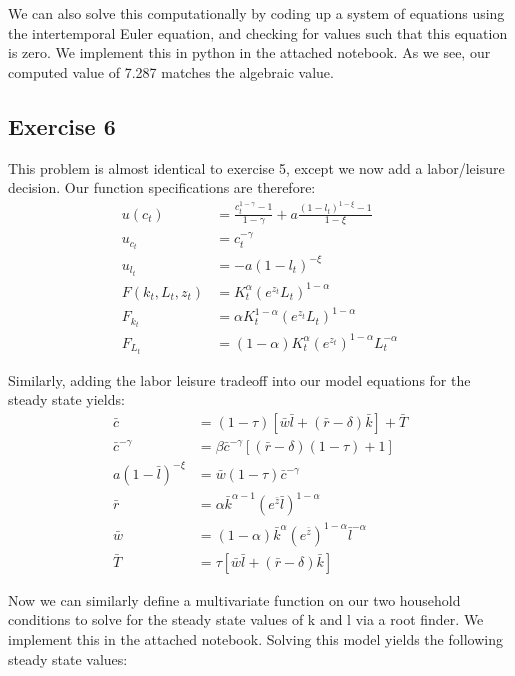 \documentclass{article}
\begin{document}
	We can also solve this computationally by coding up a system of equations using the intertemporal Euler equation, and checking for values such that this equation is zero. We implement this in python in the attached notebook. As we see, our computed value of 7.287 matches the algebraic value. 
	
	\subsection*{Exercise 6}
	This problem is almost identical to exercise 5, except we now add a labor/leisure decision. Our function specifications are therefore:
	\begin{align*}
	u(c_t) &= \frac{c_t^{1 - \gamma} - 1}{1 - \gamma}  + a\frac{(1-l_t)^{1-\xi} -1}{1 -\xi} \\
	u_{c_t} &= c_t^{-\gamma} \\
	u_{l_t} &= - a (1 -l_t)^{-\xi} \\
	F(k_t, L_t, z_t) &= K_t^{\alpha} (e^{z_t}L_t)^{1-\alpha} \\
	F_{k_t} &= \alpha K_t^{1-\alpha} (e^{z_t}L_t)^{1-\alpha} \\
	F_{L_t} &= (1-\alpha) K_t^{\alpha} (e^{z_t})^{1-\alpha} L_t^{-\alpha} 
	\end{align*}	
	
	Similarly, adding the labor leisure tradeoff into our model equations for the steady state yields:
	\begin{align}
	\bar{c} &= (1 -\tau)[\bar{w} \bar{l} + (\bar{r} - \delta)\bar{k}] + \bar{T} \\
	\bar{c}^{-\gamma} &= \beta \bar{c}^{-\gamma}[(\bar{r} - \delta)(1 -\tau) + 1]  \\
	a(1-\bar{l})^{-\xi} &= \bar{w}(1-\tau) \bar{c}^{-\gamma} \\
	\bar{r} &= \alpha \bar{k}^{\alpha -1} (e^{\bar{z}} \bar{l})^{1-\alpha}\\
	\bar{w} &= (1-\alpha) \bar{k}^{\alpha} (e^{\bar{z}})^{1-\alpha} \bar{l}^{-\alpha} \\
	\bar{T} &= \tau[\bar{w} \bar{l} + (\bar{r} - \delta) \bar{k}] 
	\end{align}

	Now we can similarly define a multivariate function on our two household conditions to solve for the steady state values of k and l via a root finder. We implement this in the attached notebook. Solving this model yields the following steady state values:
	
\end{document}

